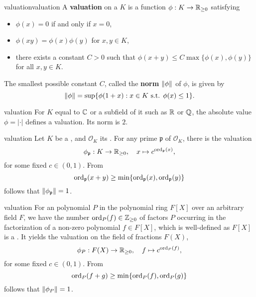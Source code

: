 \begin{topic}{valuation}{valuation}
    A \textbf{valuation} on a  $K$ is a function $\phi : K \to \mathbb{R}_{\ge 0}$ satisfying
    \begin{itemize}
        \item $\phi(x) = 0$ if and only if $x = 0$,
        \item $\phi(xy) = \phi(x) \phi(y)$ for $x, y \in K$,
        \item there exists a constant $C > 0$ such that $\phi(x + y) \le C \max \{ \phi(x), \phi(y) \}$ for all $x, y \in K$.
    \end{itemize}
    The smallest possible constant $C$, called the \textbf{norm} $\left\|\phi\right\|$ of $\phi$, is given by
    \[ \left\|\phi\right\| = \sup \{ \phi(1 + x) : x \in K \textup{ s.t. } \phi(x) \le 1 \} . \]
\end{topic}

\begin{example}{valuation}
    For $K$ equal to $\mathbb{C}$ or a subfield of it such as $\mathbb{R}$ or $\mathbb{Q}$, the absolute value $\phi = |\cdot|$ defines a valuation. Its norm is $2$.
\end{example}

\begin{example}{valuation}
    Let $K$ be a , and $\mathcal{O}_K$ its . For any prime $\mathfrak{p}$ of $\mathcal{O}_K$, there is the valuation
    \[ \phi_\mathfrak{p} : K \to \mathbb{R}_{\ge 0}, \quad x \mapsto c^{\textup{ord}_\mathfrak{p}(x)} , \]
    for some fixed $c \in (0, 1)$. From
    \[ \textup{ord}_\mathfrak{p}(x + y) \ge \min \{ \textup{ord}_\mathfrak{p}(x), \textup{ord}_\mathfrak{p}(y) \} \]
    follows that $\left\|\phi_\mathfrak{p}\right\| = 1$.
\end{example}

\begin{example}{valuation}
    For an  polynomial $P$ in the polynomial ring $F[X]$ over an arbitrary field $F$, we have the number $\textup{ord}_P(f) \in \mathbb{Z}_{\ge 0}$ of factors $P$ occurring in the factorization of a non-zero polynomial $f \in F[X]$, which is well-defined as $F[X]$ is a . It yields the valuation on the field of fractions $F(X)$,
    \[ \phi_P : F(X) \to \mathbb{R}_{\ge 0}, \quad f \mapsto c^{\textup{ord}_P(f)} ,  \]
    for some fixed $c \in (0, 1)$. From
    \[ \textup{ord}_P(f + g) \ge \min \{ \textup{ord}_P(f), \textup{ord}_P(g) \} \]
    follows that $\left\|\phi_P\right\| = 1$.
\end{example}

